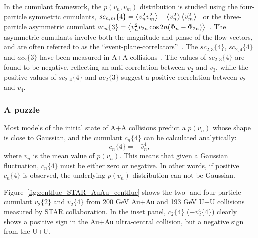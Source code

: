 In the cumulant framework, the $p(v_n,v_m)$ distribution is studied using the four-particle symmetric cumulants, $sc_{n,m}\{4\}=\left\langle v_n^2 v_m^2\right\rangle-\left\langle v_n^2\right\rangle\left\langle v_m^2\right\rangle$~\cite{Bilandzic:2013kga} or the three-particle asymmetric cumulant $ac_n\{3\}=\left\langle v_n^2 v_{2n} \cos 2n(\Phi_n-\Phi_{2n})\right\rangle$~\cite{Jia:2017hbm}. The asymmetric cumulants involve both the magnitude and phase of the flow vectors, and are often referred to as the ``event-plane-correlators''~\cite{Aad:2014fla}. The $sc_{2,3}\{4\}$, $sc_{2,4}\{4\}$ and $ac_2\{3\}$ have been measured in A+A collisions~\cite{Aad:2014fla, Aad:2015lwa, ALICE:2016kpq, STAR:2018fpo}. The values of $sc_{2,3}\{4\}$ are found to be negative, reflecting an anti-correlation between $v_2$ and $v_3$, while the positive values of $sc_{2,4}\{4\}$ and $ac_2\{3\}$ suggest a positive correlation between $v_2$ and $v_4$.



\subsubsection{A puzzle}

Most models of the initial state of A+A collisions predict a $p(v_n)$ whose shape is close to Gaussian, and the cumulant $c_n\{4\}$ can be calculated analytically:
\begin{equation}
c_n\{4\} = - \bar{v}_n^4,
\end{equation}
where $\bar{v}_n$ is the mean value of $p(v_n)$. This means that given a Gaussian fluctuation, $c_n\{4\}$ must be either zero or negative. In other words, if positive $c_n\{4\}$ is observed, the underlying $p(v_n)$ distribution can not be Gaussian.

Figure~\ref{fig:centfluc_STAR_AuAu_centfluc} shows the two- and four-particle cumulant $v_2\{2\}$ and $v_2\{4\}$ from 200 GeV Au+Au and 193 GeV U+U collisions measured by STAR collaboration. In the inset panel, $c_2\{4\}$ ($-v_2^4\{4\}$) clearly shows a positive sign in the Au+Au ultra-central collision, but a negative sign from the U+U.

